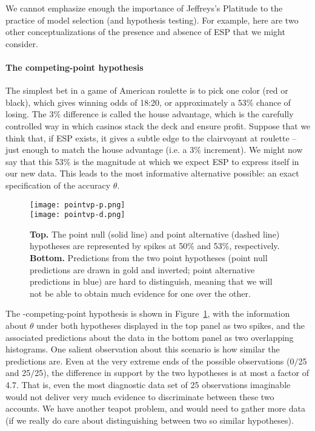 We cannot emphasize enough the importance of Jeffreys's Platitude to the practice of model selection (and hypothesis testing).  For example, here are two other conceptualizations of the presence and absence of ESP that we might consider.

\paragraph{The competing-point hypothesis} 
The simplest bet in a game of American roulette is to pick one color (red or black), which gives winning odds of 18:20, or approximately a 53\% chance of losing.  The 3\% difference is called the house advantage, which is the carefully controlled way in which casinos stack the deck and ensure profit. Suppose that we think that, if ESP exists, it gives a subtle edge to the clairvoyant at roulette -- just enough to match the house advantage (i.e. a 3\% increment). We might now say that this 53\% is the magnitude at which we expect ESP to express itself in our new data. This leads to the most informative alternative possible: an exact specification of the accuracy $\theta$. 

\begin{figure}[tb]
\texttt{[image: pointvp-p.png]}\\
\texttt{[image: pointvp-d.png]}
\caption{\textbf{Top.} The point null (solid line) and point alternative (dashed line) hypotheses are represented by spikes at 50\% and 53\%, respectively. \textbf{Bottom.} Predictions from the two point hypotheses (point null predictions are drawn in gold and inverted; point alternative predictions in blue) are hard to distinguish, meaning that we will not be able to obtain much evidence for one over the other.}\label{fig:v}
\end{figure}

The \hyp{competing-point hypothesis} is shown in Figure~\ref{fig:v}, with the information about $\theta$ under both hypotheses displayed in the top panel as two spikes, and the associated predictions about the data in the bottom panel as two overlapping histograms.  One salient observation about this scenario is how similar the predictions are.  Even at the very extreme ends of the possible observations (0$/$25 and 25$/$25), the difference in support by the two hypotheses is at most a factor of 4.7.  That is, even the most diagnostic data set of 25 observations imaginable would not deliver very much evidence to discriminate between these two accounts. We have another teapot problem, and would need to gather more data (if we really do care about distinguishing between two so similar hypotheses).

